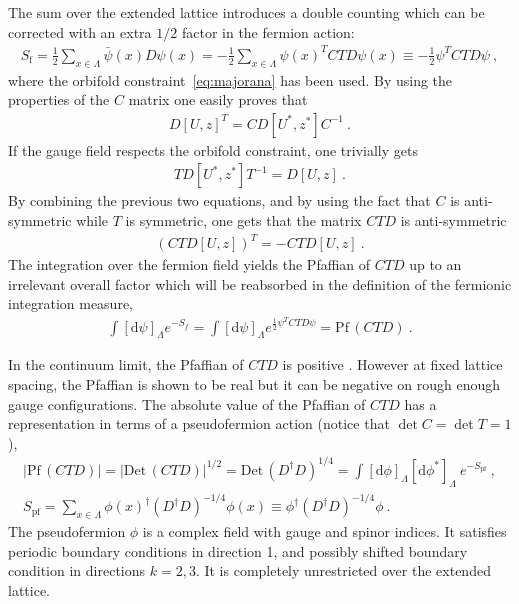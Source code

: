 \documentclass[11pt,fleqn]{article}
\renewcommand{\d}{\mathrm{d}}
\begin{document}
The sum over the extended lattice introduces a double counting which can be corrected with an extra $1/2$ factor in the fermion action:
\begin{gather}
   S_\text{f} = \frac{1}{2} \sum_{x \in \Lambda} \bar{\psi}(x) D \psi(x) = - \frac{1}{2} \sum_{x \in \Lambda} \psi(x)^T C T D \psi(x) \equiv -\frac{1}{2} \psi^T CTD \psi \ ,
\end{gather}
where the orbifold constraint~\eqref{eq:majorana} has been used. By using the properties of the $C$ matrix one easily proves that
\begin{gather}
   D[U,z]^T = C D[U^*,z^*] C^{-1} \ .
\end{gather}
If the gauge field respects the orbifold constraint, one trivially gets
\begin{gather}
   T D[U^*,z^*] T^{-1} = D[U,z] \ .
\end{gather}
By combining the previous two equations, and by using the fact that $C$ is anti-symmetric while $T$ is symmetric, one gets that the matrix $CTD$ is anti-symmetric
\begin{gather}
   (CTD[U,z])^T = - CTD[U,z] \ .
\end{gather}
The integration over the fermion field yields the Pfaffian of $CTD$ up to an irrelevant overall factor which will be reabsorbed in the definition of the fermionic integration measure,
\begin{gather}
   \int [ \d \psi ]_\Lambda e^{- S_f} = \int [ \d \psi ]_\Lambda e^{\frac{1}{2} \psi^T CTD \psi} = \text{Pf}\, (CTD) \ .
\end{gather}

In the continuum limit, the Pfaffian of $CTD$ is positive \cite{Lucini:2015hfa}. However at fixed lattice spacing, the Pfaffian is shown to be real but it can be negative on rough enough gauge configurations. The absolute value of the Pfaffian of $CTD$ has a representation in terms of a pseudofermion action (notice that $\det C = \det T = 1$),
\begin{gather}
   | \text{Pf}\, (CTD) | = | \text{Det}\, (CTD) |^{1/2} = \text{Det}\, (D^\dag D)^{1/4}
   =
   \int [\d \phi]_\Lambda [\d \phi^*]_\Lambda \ e^{-S_\text{pf}} \ , \\
   S_\text{pf}
   =
   \sum_{x \in \Lambda} \phi(x)^\dag (D^\dag D)^{-1/4} \phi(x)
   \equiv
   \phi^\dag (D^\dag D)^{-1/4} \phi
   \ .
\end{gather}
The pseudofermion $\phi$ is a complex field with gauge and spinor indices. It satisfies periodic boundary conditions in direction 1, and possibly shifted boundary condition in directions $k=2,3$. It is completely unrestricted over the extended lattice.
\end{document}
